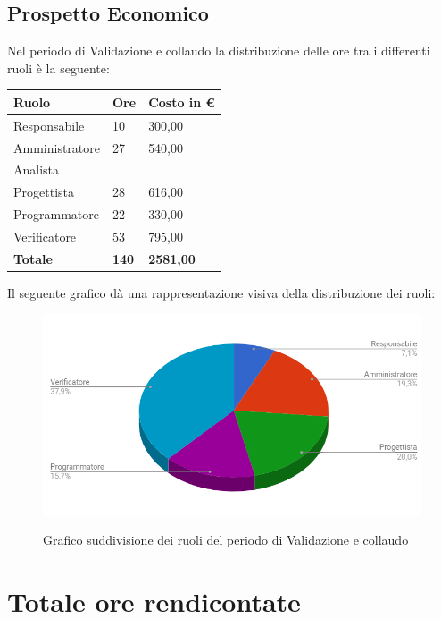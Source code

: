 \documentclass[PianoDiProgetto.tex]{subfiles}
\begin{document}
\subsection{Prospetto Economico}
Nel periodo di Validazione e collaudo la distribuzione delle ore tra i differenti ruoli è la seguente:
\begin{center}
	\begin{table}[htbp]
		\centering
		\renewcommand\arraystretch{1.5}
		\begin{tabularx}{\textwidth}{p{5cm}|p{4cm}|p{4cm}}
			\hline
			\textbf{Ruolo} & \textbf{Ore} & \textbf{Costo in \euro} \\
			\hline
			Responsabile & 10 & 300,00 \\
			\hline
			Amministratore & 27 & 540,00 \\
			\hline
			Analista & \ & \ \\
			\hline
			Progettista & 28 & 616,00 \\
			\hline
			Programmatore & 22 & 330,00 \\
			\hline
			Verificatore & 53 & 795,00 \\
			\hline
			\textbf{Totale} & \textbf{140} & \textbf{2581,00}\\
			\hline
		\end{tabularx}
	\end{table} 
\end{center}
Il seguente grafico dà una rappresentazione visiva della distribuzione dei ruoli:
\begin{figure}[h]
	\centering
	\includegraphics[width=12.5cm]{images/prospettoEconomico/valCol.png}
	\label{fig:foo}
	\caption{Grafico suddivisione dei ruoli del periodo di Validazione e collaudo}
\end{figure} 
\clearpage
\section{Totale ore rendicontate}
\end{document}
